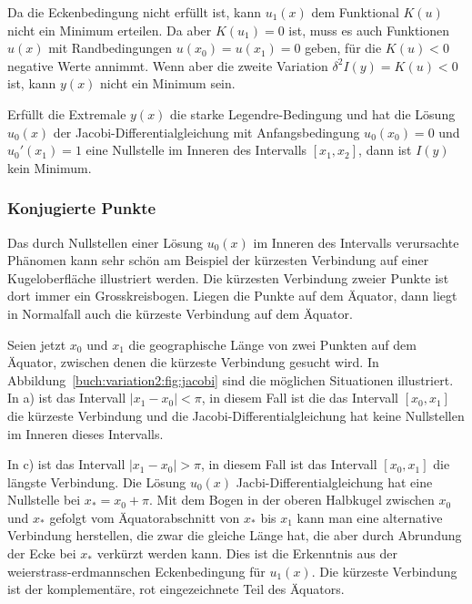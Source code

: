 Da die Eckenbedingung nicht erfüllt ist, kann $u_1(x)$ dem Funktional
$K(u)$ nicht ein Minimum erteilen.
Da aber $K(u_1)=0$ ist, muss es auch Funktionen $u(x)$ mit Randbedingungen
$u(x_0)=u(x_1)=0$ geben, für die $K(u)<0$ negative Werte annimmt.
Wenn aber die zweite Variation $\delta^2I(y)=K(u)<0$ ist, kann $y(x)$
nicht ein Minimum sein.

\begin{satz}
Erfüllt die Extremale $y(x)$ die starke Legendre-Bedingung und hat
die Lösung $u_0(x)$ der Jacobi-Differentialgleichung mit Anfangsbedingung
$u_0(x_0)=0$ und $u_0'(x_1)=1$ eine Nullstelle im Inneren des Intervalls
$[x_1,x_2]$, dann ist $I(y)$ kein Minimum.
\end{satz}

%
%
\subsubsection{Konjugierte Punkte}

Das durch Nullstellen einer Lösung $u_0(x)$ im Inneren des Intervalls
verursachte Phänomen kann sehr schön am Beispiel der kürzesten
Verbindung auf einer Kugeloberfläche illustriert werden.
Die kürzesten Verbindung zweier Punkte ist dort immer ein Grosskreisbogen.
Liegen die Punkte auf dem Äquator, dann liegt in Normalfall auch die
kürzeste Verbindung auf dem Äquator.

Seien jetzt $x_0$ und $x_1$ die geographische Länge von zwei Punkten
auf dem Äquator, zwischen denen die kürzeste Verbindung gesucht wird.
In Abbildung~\ref{buch:variation2:fig:jacobi} sind die möglichen
Situationen illustriert.
In a) ist das Intervall $|x_1-x_0|<\pi$, in diesem Fall ist die
das Intervall $[x_0,x_1]$ die kürzeste Verbindung und die 
Jacobi-Differentialgleichung hat keine Nullstellen im Inneren 
dieses Intervalls.

In c) ist das Intervall $|x_1-x_0|>\pi$, in diesem Fall ist das Intervall
$[x_0,x_1]$ die längste Verbindung.
Die Lösung $u_0(x)$ Jacbi-Differentialgleichung hat eine Nullstelle
bei $x_*=x_0+\pi$.
Mit dem Bogen in der oberen Halbkugel zwischen $x_0$ und $x_*$
gefolgt vom Äquatorabschnitt von $x_*$ bis $x_1$ kann man eine
alternative Verbindung herstellen, die zwar die gleiche Länge hat,
die aber durch Abrundung der Ecke bei $x_*$ verkürzt werden kann.
Dies ist die Erkenntnis aus der weierstrass-erdmannschen
Eckenbedingung für $u_1(x)$.
Die kürzeste Verbindung ist der komplementäre, rot eingezeichnete
Teil des Äquators.

